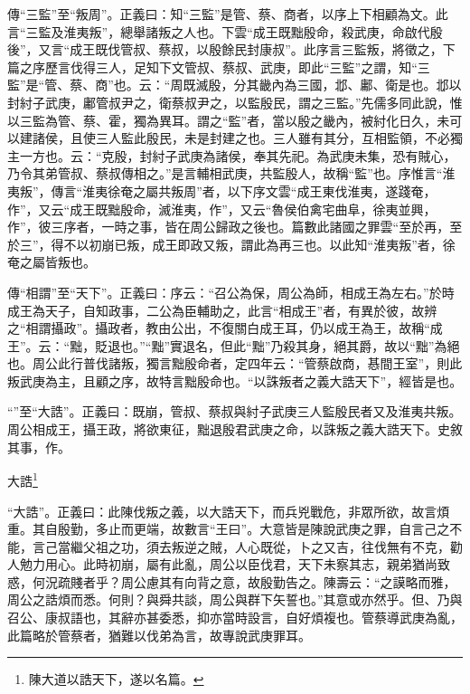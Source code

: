 {\noindent\zhuan{}\fzbyks 傳“三監”至“叛周”。正義曰：知“三監”是管、蔡、商者，以序上下相顧為文。此言“三監及淮夷叛”，總舉諸叛之人也。下雲“成王既黜殷命，殺武庚，命啟代殷後”，又言“成王既伐管叔、蔡叔，以殷餘民封康叔”。此序言三監叛，將徵之，下篇之序歷言伐得三人，足知下文管叔、蔡叔、武庚，即此“三監”之謂，知“三監”是“管、蔡、商”也。云：“周既滅殷，分其畿內為三國，邶、鄘、衛是也。邶以封紂子武庚，鄘管叔尹之，衛蔡叔尹之，以監殷民，謂之三監。”先儒多同此說，惟以三監為管、蔡、霍，獨為異耳。謂之“監”者，當以殷之畿內，被紂化日久，未可以建諸侯，且使三人監此殷民，未是封建之也。三人雖有其分，互相監領，不必獨主一方也。云：“克殷，封紂子武庚為諸侯，奉其先祀。為武庚未集，恐有賊心，乃令其弟管叔、蔡叔傳相之。”是言輔相武庚，共監殷人，故稱“監”也。序惟言“淮夷叛”，傳言“淮夷徐奄之屬共叛周”者，以下序文雲“成王東伐淮夷，遂踐奄，作”，又云“成王既黜殷命，滅淮夷，作”，又云“魯侯伯禽宅曲阜，徐夷並興，作”，彼三序者，一時之事，皆在周公歸政之後也。篇數此諸國之罪雲“至於再，至於三”，得不以初崩已叛，成王即政又叛，謂此為再三也。以此知“淮夷叛”者，徐奄之屬皆叛也。 \par}

{\noindent\zhuan{}\fzbyks 傳“相謂”至“天下”。正義曰：序云：“召公為保，周公為師，相成王為左右。”於時成王為天子，自知政事，二公為臣輔助之，此言“相成王”者，有異於彼，故辨之“相謂攝政”。攝政者，教由公出，不復關白成王耳，仍以成王為王，故稱“成王”。云：“黜，貶退也。”“黜”實退名，但此“黜”乃殺其身，絕其爵，故以“黜”為絕也。周公此行普伐諸叛，獨言黜殷命者，定四年云：“管蔡啟商，惎間王室”，則此叛武庚為主，且顧之序，故特言黜殷命也。“以誅叛者之義大誥天下”，經皆是也。 \par}

{\noindent\shu{}\fzkt “”至“大誥”。正義曰：既崩，管叔、蔡叔與紂子武庚三人監殷民者又及淮夷共叛。周公相成王，攝王政，將欲東征，黜退殷君武庚之命，以誅叛之義大誥天下。史敘其事，作。 \par}

大誥\footnote{陳大道以誥天下，遂以名篇。}

{\noindent\shu{}\fzkt “大誥”。正義曰：此陳伐叛之義，以大誥天下，而兵兇戰危，非眾所欲，故言煩重。其自殷勤，多止而更端，故數言“王曰”。大意皆是陳說武庚之罪，自言己之不能，言己當繼父祖之功，須去叛逆之賊，人心既從，卜之又吉，往伐無有不克，勸人勉力用心。此時初崩，屬有此亂，周公以臣伐君，天下未察其志，親弟猶尚致惑，何況疏賤者乎？周公慮其有向背之意，故殷勤告之。陳壽云：“之謨略而雅，周公之誥煩而悉。何則？與舜共談，周公與群下矢誓也。”其意或亦然乎。但、乃與召公、康叔語也，其辭亦甚委悉，抑亦當時設言，自好煩複也。管蔡導武庚為亂，此篇略於管蔡者，猶難以伐弟為言，故專說武庚罪耳。 \par}


